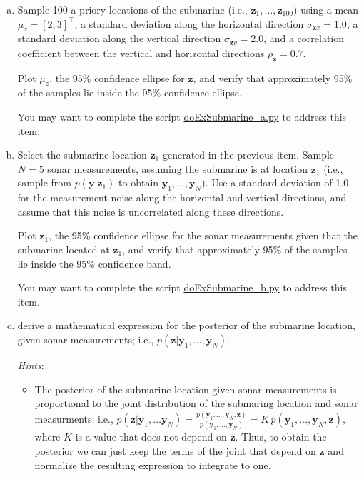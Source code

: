 \documentclass[12pt]{article}
\begin{document}
\begin{enumerate}[(a)]

    \item Sample 100 a priory locations of the submarine
        (i.e., $\mathbf{z}_1,\ldots,\mathbf{z}_{100}$) using
        a mean $\mu_z=[2,3]^\intercal$, a standard deviation along the
        horizontal direction $\sigma_{\mathbf{z}x}=1.0$, a standard
        deviation along the vertical direction $\sigma_{\mathbf{z}y}=2.0$,
        and a correlation coefficient between the vertical and horizontal
        directions $\rho_{\mathbf{z}}=0.7$.

        Plot $\mu_z$, the 95\% confidence ellipse for $\mathbf{z}$, and
        verify that approximately 95\% of the samples lie inside the 95\%
        confidence ellipse.

        You may want to complete the script
        \href{http://github.com/joacorapela/gcnu\_bridging2023}{doExSubmarine\_a.py}
        to address this item.

    \item Select the submarine location $\mathbf{z}_1$ generated in
        the previous item. Sample $N=5$ sonar measurements, assuming the
        submarine is at location $\mathbf{z}_1$ (i.e., sample from
        $p(\mathbf{y}|\mathbf{z}_1)$ to obtain
        $\mathbf{y}_1,\ldots,\mathbf{y}_N$). Use a standard deviation of
        1.0 for the measurement noise along the horizontal and vertical
        directions, and assume that this noise is uncorrelated along these
        directions.

        Plot $\mathbf{z}_1$, the 95\% confidence ellipse for the sonar
        measurements given that the submarine located at $\mathbf{z}_1$,
        and verify that approximately 95\% of the samples lie inside the
        95\% confidence band.

        You may want to complete the script
        \href{http://github.com/joacorapela/gcnu\_bridging2023}{doExSubmarine\_b.py}
        to address this item.

    \item derive a mathematical expression for the posterior of the
        submarine location, given sonar measurements; i.e.,
        $p(\mathbf{z}|\mathbf{y}_1,\ldots,\mathbf{y}_N)$.

        \textit{Hints}: 

        \begin{itemize}

            \item The posterior of the submarine location given sonar
                measurements is proportional to the joint distribution of
                the submaring location and sonar measurments; i.e.,
                $p(\mathbf{z}|\mathbf{y}_1,\ldots\mathbf{y}_N)=\frac{p(\mathbf{y}_1,\ldots,\mathbf{y}_N,\mathbf{z})}{p(\mathbf{y}_1,\ldots,\mathbf{y}_N)}=K\,p(\mathbf{y}_1,\ldots,\mathbf{y}_N,\mathbf{z})$,
                where $K$ is a value that does not depend on $\mathbf{z}$. Thus, to
                obtain the posterior we can just keep the terms of the
                joint that depend on $\mathbf{z}$ and normalize the
                resulting expression to integrate to one.


\end{itemize}
\end{enumerate}
\end{document}
